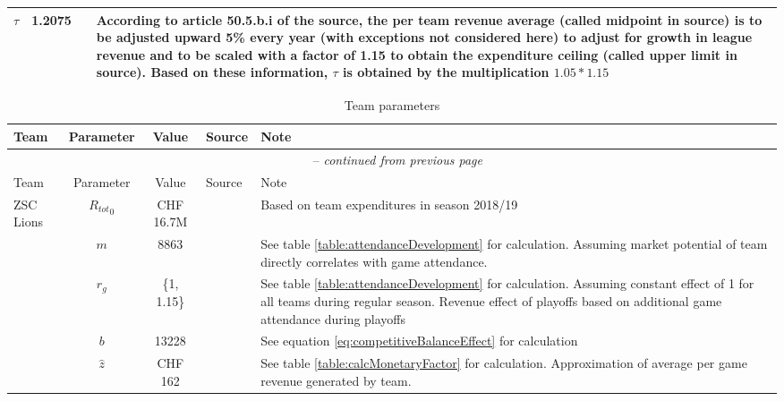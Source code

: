 \begin{longtable}[h!]{lc>{\baselineskip=15pt}p{4cm}>{\baselineskip=15pt}p{6cm}}
    $\tau$  & 1.2075 & \cite{nhl_collective_2012} & According to article 50.5.b.i of the source, the per team revenue average (called midpoint in source) is to be adjusted upward 5\% every year (with exceptions not considered here) to adjust for growth in league revenue and to be scaled with a factor of 1.15 to obtain the expenditure ceiling (called upper limit in source). Based on these information, $\tau$ is obtained by the multiplication $1.05*1.15$\\
    \bottomrule
            
\end{longtable}

\vfill

\newpage

\small 
\renewcommand*{\arraystretch}{1.3}
\begin{longtable}[h!]{p{1.5cm}cc>{\baselineskip=13pt}p{3cm}>{\baselineskip=13pt}p{5.5cm}}

    \caption{Team parameters}
    \label{table:teamParams} \\
    
    \toprule
    Team & Parameter & Value & Source & Note \\
    \midrule
    \endfirsthead

    \multicolumn{5}{c}{{{\bfseries \tablename\ \thetable{}} -- \textit{continued from previous page}}}\\
    \toprule
    Team & Parameter & Value & Source & Note \\
    \midrule
    \endhead
    
    \multirow[t]{5}{=}{ZSC Lions} & ${R_{tot}}_{0}$ & CHF 16.7M & \cite{graf_17_2019} & Based on team expenditures in season 2018/19 \\
                                    & $m$ & 8863 & \cite{national_league_zuschauerzahlen_2022} & See table \ref{table:attendanceDevelopment} for calculation. Assuming market potential of team directly correlates with game attendance. \\
                                    & $r_g$ & \{1, 1.15\} & \cite{national_league_zuschauerzahlen_2022} & See table \ref{table:attendanceDevelopment} for calculation. Assuming constant effect of 1 for all teams during regular season. Revenue effect of playoffs based on additional game attendance during playoffs \\
                                    & $b$ & 13228 &  & See equation \ref{eq:competitiveBalanceEffect} for calculation\\
                                    & $\hat{z}$ & CHF 162 &  & See table \ref{table:calcMonetaryFactor} for calculation. Approximation of average per game revenue generated by team. \\
    \midrule
    

\end{longtable}
